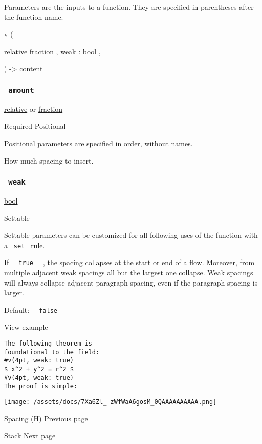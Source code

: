 \label{parameters-tooltip}
Parameters are the inputs to a function. They are specified in
parentheses after the function name.

{ v } (

{ \href{/docs/reference/layout/relative/}{relative}
\href{/docs/reference/layout/fraction/}{fraction} , } {
\hyperref[parameters-weak]{weak :}
\href{/docs/reference/foundations/bool/}{bool} , }

) -\textgreater{} \href{/docs/reference/foundations/content/}{content}

\subsubsection{\texorpdfstring{\texttt{\ amount\ }}{ amount }}\label{parameters-amount}

\href{/docs/reference/layout/relative/}{relative} {or}
\href{/docs/reference/layout/fraction/}{fraction}

{Required} {{ Positional }}

\label{parameters-amount-positional-tooltip}
Positional parameters are specified in order, without names.

How much spacing to insert.

\subsubsection{\texorpdfstring{\texttt{\ weak\ }}{ weak }}\label{parameters-weak}

\href{/docs/reference/foundations/bool/}{bool}

{{ Settable }}

\label{parameters-weak-settable-tooltip}
Settable parameters can be customized for all following uses of the
function with a \texttt{\ set\ } rule.

If \texttt{\ }{\texttt{\ true\ }}\texttt{\ } , the spacing collapses at
the start or end of a flow. Moreover, from multiple adjacent weak
spacings all but the largest one collapse. Weak spacings will always
collapse adjacent paragraph spacing, even if the paragraph spacing is
larger.

Default: \texttt{\ }{\texttt{\ false\ }}\texttt{\ }


View example

\begin{verbatim}
The following theorem is
foundational to the field:
#v(4pt, weak: true)
$ x^2 + y^2 = r^2 $
#v(4pt, weak: true)
The proof is simple:
\end{verbatim}

\texttt{[image: /assets/docs/7Xa6Zl\_-zWfWaA6gosM\_0QAAAAAAAAAA.png]}

\href{/docs/reference/layout/h/}{\pandocbounded{}}

{ Spacing (H) } { Previous page }

\href{/docs/reference/layout/stack/}{\pandocbounded{}}

{ Stack } { Next page }
